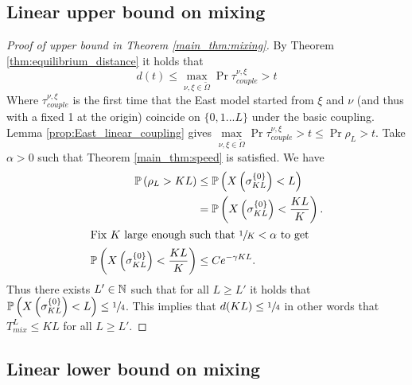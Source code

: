 \subsection{Linear upper bound on mixing}

\begin{proof}[Proof of upper bound in Theorem \ref{main_thm:mixing}]
By Theorem \ref{thm:equilibrium_distance} it holds that 
\begin{equation}\nonumber
d(t) \leq \max\limits_{\nu, \xi \in \widetilde{\Omega}} \Pr{ \tau^{\nu, \xi}_{couple} > t }
\end{equation}
Where $\tau^{\nu, \xi}_{couple}$ is the first time that the East model started from $\xi$ and $\nu$ (and thus with a fixed 1 at the origin) coincide on $\{0, 1 ... L\}$ under the basic coupling. Lemma \ref{prop:East_linear_coupling} gives $\max\limits_{\nu, \xi \in \widetilde{\Omega}} \Pr{\tau^{\nu, \xi}_{couple} > t } \leq \Pr{\rho_L > t}$. Take $\alpha > 0$ such that Theorem \ref{main_thm:speed} is satisfied. We have
\begin{align*}
\mathbb{P} \left( \rho_L > KL \right) &\leq \mathbb{P} \left( X\left(\sigma^{\{0\}}_{KL}\right) < L \right) \\
                 &= \mathbb{P} \left( X\left(\sigma^{\{0\}}_{KL}\right) < \frac{KL}{K} \right). \\
  \intertext{Fix $K$ large enough such that $\sfrac{1}{K} < \alpha$ to get}
                \mathbb{P} \left( X\left(\sigma^{\{0\}}_{KL}\right) < \frac{KL}{K} \right) &\leq C e^{-\gamma K L}. 
\end{align*}
Thus there exists $L' \in \mathbb{N}$ such that for all $L \geq L'$ it holds that $\mathbb{P} \left( X\left(\sigma^{\{0\}}_{KL} \right) < L \right) \leq \sfrac{1}{4}$. This implies that $d(KL) \leq \sfrac{1}{4}$ in other words that $T^L_{mix} \leq KL$ for all $L \geq L'$. 
\end{proof}

\subsection{Linear lower bound on mixing}

